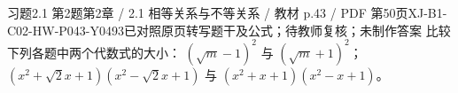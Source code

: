 \par\noindent\begin{minipage}{\linewidth}
\begin{bankitem}{习题2.1 第2题}{第2章 / 2.1 相等关系与不等关系 / 教材 p.43 / PDF 第50页}{XJ-B1-C02-HW-P043-Y0493}{已对照原页转写题干及公式；待教师复核；未制作答案}
比较下列各题中两个代数式的大小：
$(\sqrt m-1)^2$ 与 $(\sqrt m+1)^2$；
$(x^2+\sqrt2x+1)(x^2-\sqrt2x+1)$ 与 $(x^2+x+1)(x^2-x+1)$。
\end{bankitem}
\end{minipage}\par\medskip
